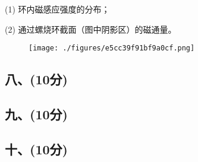 (1) 环内磁感应强度的分布；

(2) 通过螺烧环截面（图中阴影区）的磁通量。
\begin{figure}[ht]
\centering
\texttt{[image: ./figures/e5cc39f91bf9a0cf.png]}
\caption{} \label{fig_NJU10_7}
\end{figure}
\subsection{八、(10分)}

\subsection{九、(10分)}

\subsection{十、(10分)}